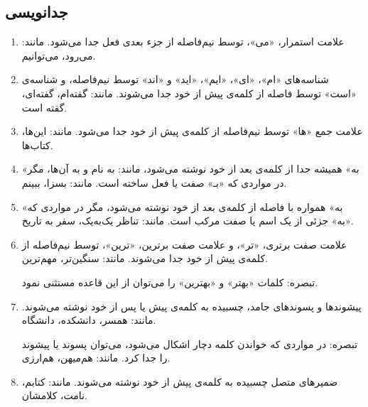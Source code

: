 \subsection{جدانویسی}

\begin{enumerate}


\item 
علامت استمرار، «می»، توسط نیم‌فاصله از جزء‌ بعدی فعل جدا می‌شود. مانند: می‌رود، می‌توانیم.
\item 
شناسه‌های «ام»، «ای»، «ایم»، «اید» و «اند» توسط نیم‌فاصله، و شناسه‌ی «است» توسط فاصله از کلمه‌ی پیش از خود جدا می‌شوند. مانند: گفته‌ام، گفته‌ای، گفته است.
\item 
علامت جمع «ها» توسط نیم‌فاصله از کلمه‌ی پیش از خود جدا می‌شود. مانند: این‌ها، کتاب‌ها.
\item 
«به» همیشه جدا از کلمه‌ی بعد از خود نوشته می‌شود، مانند: به‌ نام و به آن‌ها، مگر در مواردی که «بـ» صفت یا فعل ساخته است. مانند: بسزا، ببینم.
\item 
«به» همواره با فاصله از کلمه‌ی بعد از خود نوشته می‌شود، مگر در مواردی که «به» جزئی از یک اسم یا صفت مرکب است. مانند: تناظر یک‌به‌یک، سفر به تاریخ. 
%
%
%

%

\item 
علامت صفت برتری، «تر»، و علامت صفت برترین، «ترین»، توسط نیم‌فاصله از کلمه‌ی پیش از خود جدا می‌شوند. 
مانند: سنگین‌تر، مهم‌ترین.

        تبصره‌: کلمات «بهتر» و «بهترین» را می‌توان از این قاعده مستثنی نمود. 

\item 
پیشوندها و پسوندهای جامد، چسبیده به کلمه‌ی پیش یا پس از خود نوشته می‌شوند. مانند: همسر، دانشکده، دانشگاه.

        تبصره‌: در مواردی که خواندن کلمه دچار اشکال می‌شود، می‌توان پسوند یا پیشوند را جدا کرد. مانند: هم‌میهن، هم‌ارزی. 

\item 
ضمیرهای متصل چسبیده به کلمه‌ی پیش‌ از خود نوشته می‌شوند. مانند: کتابم، نامت، کلامشان. 

\end{enumerate}

